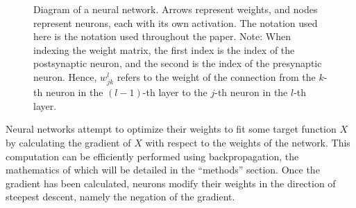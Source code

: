 \documentclass[12pt]{article}
\begin{document}
\begin{figure}
	\centering
	\caption{Diagram of a neural network. Arrows represent weights, and nodes represent neurons, each with its own activation. The notation used here is the notation used throughout the paper. Note: When indexing the weight matrix, the first index is the index of the postsynaptic neuron, and the second is the index of the presynaptic neuron. Hence, $w^l_{jk}$ refers to the weight of the connection from the $k$-th neuron in the $(l-1)$-th layer to the $j$-th neuron in the $l$-th layer.}
\end{figure}

Neural networks attempt to optimize their weights to fit some target function $X$ by calculating the gradient of $X$ with respect to the weights of the network. This computation can be efficiently performed using backpropagation, the mathematics of which will be detailed in the ``methods'' section. Once the gradient has been calculated, neurons modify their weights in the direction of steepest descent, namely the negation of the gradient.
\end{document}
